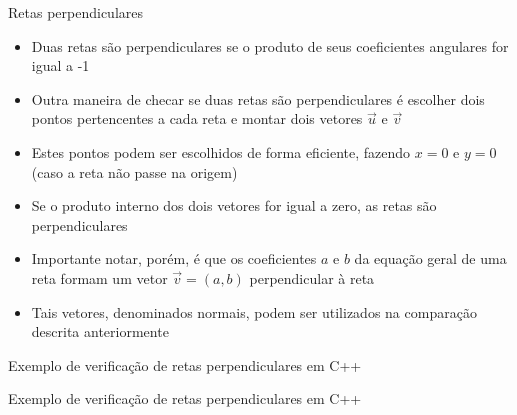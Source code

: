 \begin{frame}[fragile]{Retas perpendiculares}

    \begin{itemize}
        \item Duas retas são perpendiculares se o produto de seus coeficientes angulares for igual a -1

        \item Outra maneira de checar se duas retas são perpendiculares é escolher dois pontos 
        pertencentes a cada reta e montar dois vetores $\vec{u}$ e $\vec{v}$ 

        \item Estes pontos podem ser escolhidos de forma eficiente, fazendo $x = 0$ e $y = 0$
        (caso a reta não passe na origem)

        \item Se o produto interno dos dois vetores for igual a zero, as retas são perpendiculares

        \item Importante notar, porém, é que os coeficientes $a$ e $b$ da equação geral de uma 
            reta formam um vetor $\vec{v} = (a, b)$ perpendicular à reta

        \item Tais vetores, denominados normais, podem ser utilizados na comparação descrita anteriormente


    \end{itemize}

\end{frame}

\begin{frame}[fragile]{Exemplo de verificação de retas perpendiculares em C++}
\end{frame}

\begin{frame}[fragile]{Exemplo de verificação de retas perpendiculares em C++}
\end{frame}
